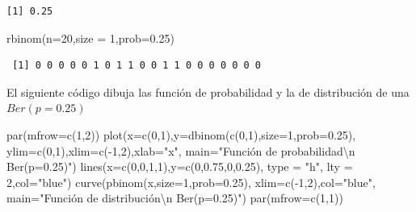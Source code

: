 \documentclass[
  letterpaper,
  DIV=11,
  numbers=noendperiod]{scrreprt}
\newenvironment{Shaded}{\begin{snugshade}}{\end{snugshade}}
\newcommand{\AttributeTok}[1]{\textcolor[rgb]{0.40,0.45,0.13}{#1}}
\newcommand{\DecValTok}[1]{\textcolor[rgb]{0.68,0.00,0.00}{#1}}
\newcommand{\FloatTok}[1]{\textcolor[rgb]{0.68,0.00,0.00}{#1}}
\newcommand{\FunctionTok}[1]{\textcolor[rgb]{0.28,0.35,0.67}{#1}}
\newcommand{\NormalTok}[1]{\textcolor[rgb]{0.00,0.23,0.31}{#1}}
\newcommand{\SpecialCharTok}[1]{\textcolor[rgb]{0.37,0.37,0.37}{#1}}
\newcommand{\StringTok}[1]{\textcolor[rgb]{0.13,0.47,0.30}{#1}}
\begin{document}
\begin{verbatim}
[1] 0.25
\end{verbatim}

\begin{Shaded}
\begin{Highlighting}[]
\FunctionTok{rbinom}\NormalTok{(}\AttributeTok{n=}\DecValTok{20}\NormalTok{,}\AttributeTok{size =} \DecValTok{1}\NormalTok{,}\AttributeTok{prob=}\FloatTok{0.25}\NormalTok{)}
\end{Highlighting}
\end{Shaded}

\begin{verbatim}
 [1] 0 0 0 0 0 1 0 1 1 0 0 1 1 0 0 0 0 0 0 0
\end{verbatim}

El siguiente código dibuja las función de probabilidad y la de
distribución de una \(Ber(p=0.25)\)

\begin{Shaded}
\begin{Highlighting}[]
\FunctionTok{par}\NormalTok{(}\AttributeTok{mfrow=}\FunctionTok{c}\NormalTok{(}\DecValTok{1}\NormalTok{,}\DecValTok{2}\NormalTok{))}
\FunctionTok{plot}\NormalTok{(}\AttributeTok{x=}\FunctionTok{c}\NormalTok{(}\DecValTok{0}\NormalTok{,}\DecValTok{1}\NormalTok{),}\AttributeTok{y=}\FunctionTok{dbinom}\NormalTok{(}\FunctionTok{c}\NormalTok{(}\DecValTok{0}\NormalTok{,}\DecValTok{1}\NormalTok{),}\AttributeTok{size=}\DecValTok{1}\NormalTok{,}\AttributeTok{prob=}\FloatTok{0.25}\NormalTok{),}
     \AttributeTok{ylim=}\FunctionTok{c}\NormalTok{(}\DecValTok{0}\NormalTok{,}\DecValTok{1}\NormalTok{),}\AttributeTok{xlim=}\FunctionTok{c}\NormalTok{(}\SpecialCharTok{{-}}\DecValTok{1}\NormalTok{,}\DecValTok{2}\NormalTok{),}\AttributeTok{xlab=}\StringTok{"x"}\NormalTok{,}
     \AttributeTok{main=}\StringTok{"Función de probabilidad}\SpecialCharTok{\textbackslash{}n}\StringTok{ Ber(p=0.25)"}\NormalTok{)}
\FunctionTok{lines}\NormalTok{(}\AttributeTok{x=}\FunctionTok{c}\NormalTok{(}\DecValTok{0}\NormalTok{,}\DecValTok{0}\NormalTok{,}\DecValTok{1}\NormalTok{,}\DecValTok{1}\NormalTok{),}\AttributeTok{y=}\FunctionTok{c}\NormalTok{(}\DecValTok{0}\NormalTok{,}\FloatTok{0.75}\NormalTok{,}\DecValTok{0}\NormalTok{,}\FloatTok{0.25}\NormalTok{), }\AttributeTok{type =} \StringTok{"h"}\NormalTok{, }\AttributeTok{lty =} \DecValTok{2}\NormalTok{,}\AttributeTok{col=}\StringTok{"blue"}\NormalTok{)}
\FunctionTok{curve}\NormalTok{(}\FunctionTok{pbinom}\NormalTok{(x,}\AttributeTok{size=}\DecValTok{1}\NormalTok{,}\AttributeTok{prob=}\FloatTok{0.25}\NormalTok{),}
      \AttributeTok{xlim=}\FunctionTok{c}\NormalTok{(}\SpecialCharTok{{-}}\DecValTok{1}\NormalTok{,}\DecValTok{2}\NormalTok{),}\AttributeTok{col=}\StringTok{"blue"}\NormalTok{,}
      \AttributeTok{main=}\StringTok{"Función de distribución}\SpecialCharTok{\textbackslash{}n}\StringTok{ Ber(p=0.25)"}\NormalTok{)}
\FunctionTok{par}\NormalTok{(}\AttributeTok{mfrow=}\FunctionTok{c}\NormalTok{(}\DecValTok{1}\NormalTok{,}\DecValTok{1}\NormalTok{))}
\end{Highlighting}
\end{Shaded}
\end{document}
